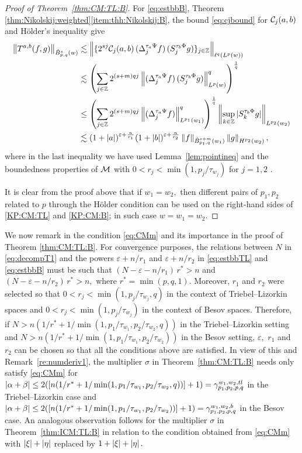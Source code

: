 {\begin{proof}[Proof of Theorem~\ref{thm:CM:TL:B}]
For \eqref{eq:estbbB},  Theorem \ref{thm:Nikolskij:weighted}\eqref{item:thh:Nikolskij:B}, the bound \eqref{eq:cjbound} for $\mathcal{C}_j(a,b)$ and H\"older's inequality  give
\begin{align*}
\left\|T^{a,b}(f,g)\right\|_{\dot{B}^s_{p,q}(w)} & \lesssim \left\|\{2^{sj} \mathcal{C}_j(a,b) \,(\Delta^{ \tau_a \Psi }_{j} f ) \, (S^{ \tau_b \Phi }_{j} g)\}_{j\in\mathbb{Z}} \right\|_{\ell^q(L^p(w))}\\
& \lesssim \left(\sum\limits_{j \in \mathbb{Z}}  2^{(s +m) q j}  \left\|(\Delta^{ \tau_a \Psi }_{j} f ) \, (S^{ \tau_b \Phi }_{j} g)\right\|_{L^p(w)}^q   \right)^\frac{1}{q}  \\
&\le  \left(\sum\limits_{j \in \mathbb{Z}}  2^{(s +m) q j}  \left\|(\Delta^{ \tau_a \Psi }_{j} f ) \right\|_{L^{p_1}(w_1)}^q   \right)^\frac{1}{q}  \left\|\sup_{k\in \mathbb{Z}}|S^{ \tau_b \Phi }_{k} g|\right\|_{L^{p_2}(w_2)}\\
& \lesssim  (1+\left\vert a \right\vert)^{\varepsilon+\frac{n}{r_1}}  (1+\left\vert b \right\vert)^{\varepsilon+\frac{n}{r_2}}  \left\|f\right\|_{\dot{B}^{s+m}_{p_1, q}(w_1)} \left\|g\right\|_{H^{p_2}(w_2)},
\end{align*}
where in the last inequality we have used Lemma~\ref{lem:pointineq} and the boundedness properties of $\mathcal{M}$ with  $0<r_j<\min(1,p_j/\tau_{w_j})$ for $j=1,2$ .


It is clear from the proof above that if $w_1=w_2,$ then  different pairs of $p_1, p_2$ related to $p$ through the H\"older condition can be used on the right-hand sides of \eqref{KP:CM:TL} and \eqref{KP:CM:B}; in such case $w=w_1=w_2.$  
\end{proof}


We now remark in the condition \ref{eq:CMm} and its importance in the proof of Theorem \ref{thm:CM:TL:B}.
For convergence purposes, the relations between $N$ in \eqref{eq:decompT1} and the powers  $\varepsilon+n/r_1$ and $\varepsilon+n/r_2$ in \eqref{eq:estbbTL} and   \eqref{eq:estbbB} must be such that $(N-\varepsilon-n/r_1)\,r^*>n$ and $(N-\varepsilon-n/r_2)\,r^*>n,$ where $r^*=\min(p,q,1).$ Moreover,  $r_1$ and $r_2$ were selected so that $0<r_j<\min(1, p_j/\tau_{w_j},q)$ in the context of  Triebel--Lizorkin spaces and  $0<r_j<\min(1,p_j/\tau_{w_j})$ in the context of Besov spaces. Therefore, if  $N>n(1/r^*+1/\min(1, p_1/\tau_{w_1},p_2/\tau_{w_2},q))$ in the Triebel--Lizorkin setting and $N>n(1/r^*+1/\min(1, p_1/\tau_{w_1},p_2/\tau_{w_2}))$ in the Besov setting,  $\varepsilon,$  $r_1$ and  $r_2$ can be chosen so that all the conditions above are satisfied. In view of this and Remark~\ref{re:numderiv1},  the multiplier $\sigma$ in Theorem~\ref{thm:CM:TL:B}  needs only satisfy  \eqref{eq:CMm} for $\left\vert \alpha+\beta \right\vert\le 2( [n(1/r^*+1/\min(1,p_1/\tau_{w_1},p_2/\tau_{w_2},q))]+1)=\gamma_{p_1,p_2,p,q}^{w_1,w_2, tl}$ in the Triebel--Lizorkin case and $\left\vert \alpha+\beta \right\vert\le 2( [n(1/r^*+1/\min(1, p_1/\tau_{w_1},p_2/\tau_{w_2}))]+1)=\gamma_{p_1,p_2,p,q}^{w_1,w_2,b}$ in the Besov case. An analogous observation follows for the multiplier $\sigma$ in Theorem~\ref{thm:ICM:TL:B} in relation to the condition  obtained from \eqref{eq:CMm} with $\left\vert \xi \right\vert+\left\vert \eta \right\vert$ replaced by $1+\left\vert \xi \right\vert+\left\vert \eta \right\vert.$ 


}
